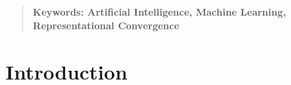 \documentclass[10pt,letterpaper]{article}
\begin{document}
{%
}
\begin{quote}
\small
\textbf{Keywords: Artificial Intelligence, Machine Learning, Representational Convergence} 
\end{quote}

\section{Introduction}


\end{document}

